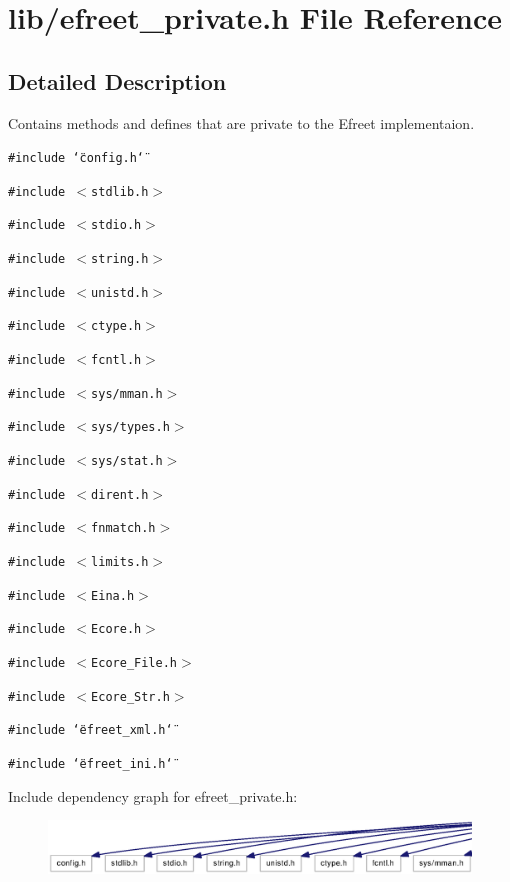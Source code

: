 \section{lib/efreet\_\-private.h File Reference}
\label{efreet__private_8h}


\subsection{Detailed Description}
Contains methods and defines that are private to the Efreet implementaion. 



{\tt \#include \char`\"{}config.h\char`\"{}}\par
{\tt \#include $<$stdlib.h$>$}\par
{\tt \#include $<$stdio.h$>$}\par
{\tt \#include $<$string.h$>$}\par
{\tt \#include $<$unistd.h$>$}\par
{\tt \#include $<$ctype.h$>$}\par
{\tt \#include $<$fcntl.h$>$}\par
{\tt \#include $<$sys/mman.h$>$}\par
{\tt \#include $<$sys/types.h$>$}\par
{\tt \#include $<$sys/stat.h$>$}\par
{\tt \#include $<$dirent.h$>$}\par
{\tt \#include $<$fnmatch.h$>$}\par
{\tt \#include $<$limits.h$>$}\par
{\tt \#include $<$Eina.h$>$}\par
{\tt \#include $<$Ecore.h$>$}\par
{\tt \#include $<$Ecore\_\-File.h$>$}\par
{\tt \#include $<$Ecore\_\-Str.h$>$}\par
{\tt \#include \char`\"{}efreet\_\-xml.h\char`\"{}}\par
{\tt \#include \char`\"{}efreet\_\-ini.h\char`\"{}}\par


Include dependency graph for efreet\_\-private.h:\nopagebreak
\begin{figure}[H]
\begin{center}
\leavevmode
\includegraphics[width=420pt]{efreet__private_8h__incl}
\end{center}
\end{figure}


